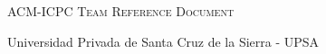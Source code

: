\documentclass[letterpaper]{article} %
\begin{document}
  \thispagestyle{fancy}
  
  \begin{center}
    \Huge\textsc{ACM-ICPC Team Reference Document}

    \huge Universidad Privada de Santa Cruz de la Sierra - UPSA

    \vspace{0.50cm}
  \end{center}
  
  \begin{multicols*}{2}
    \tableofcontents
  \end{multicols*}
  
  \enlargethispage*{\baselineskip}
  \pagebreak
  
  
  \setcounter{page}{1}
  
\end{document}

